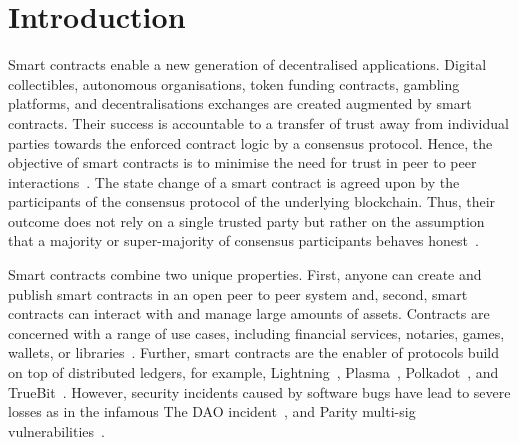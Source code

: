 \section{Introduction}
Smart contracts enable a new generation of decentralised applications.
Digital collectibles, autonomous organisations, token funding contracts, gambling platforms, and decentralisations exchanges are created augmented by smart contracts.
Their success is accountable to a transfer of trust away from individual parties towards the enforced contract logic by a consensus protocol.
Hence, the objective of smart contracts is to minimise the need for trust in peer to peer interactions~\cite{Szabo1997}.
The state change of a smart contract is agreed upon by the participants of the consensus protocol of the underlying blockchain.
Thus, their outcome does not rely on a single trusted party but rather on the assumption that a majority or super-majority of consensus participants behaves honest~\cite{Nakamoto2008,Eyal2014}.

Smart contracts combine two unique properties. 
First, anyone can create and publish smart contracts in an open peer to peer system and, second, smart contracts can interact with and manage large amounts of assets.
Contracts are concerned with a range of use cases, including financial services, notaries, games, wallets, or libraries~\cite{Bartoletti2017}.
Further, smart contracts are the enabler of protocols build on top of distributed ledgers, for example, Lightning~\cite{Poon2016}, Plasma~\cite{Poon2017}, Polkadot~\cite{Wood2017}, and TrueBit~\cite{Teutsch2017}.
However, security incidents caused by software bugs have lead to severe losses as in the infamous The DAO incident~\cite{Daian2016}, and Parity multi-sig vulnerabilities~\cite{Breidenbach2017Parity,ParityTech2017}. 

